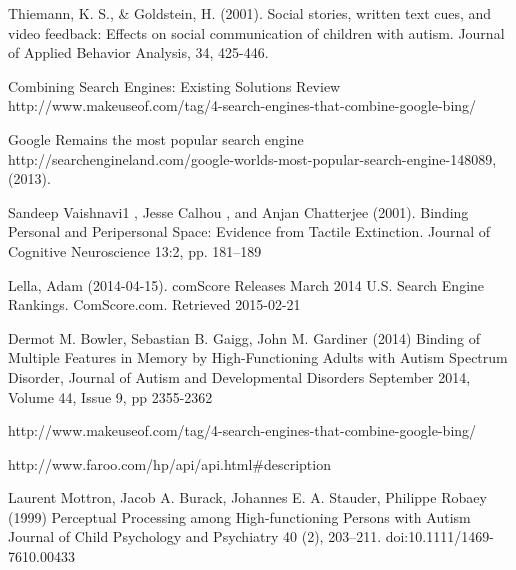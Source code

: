 \documentclass[10pt]{article}
\begin{document}
\begin{thebibliography}{100}
Thiemann, K. S., \& Goldstein, H. (2001). Social stories, written text cues, and video feedback: Effects on social communication of children with autism. Journal of Applied Behavior Analysis, 34, 425-446.


Combining Search Engines: Existing Solutions Review
http://www.makeuseof.com/tag/4-search-engines-that-combine-google-bing/


Google Remains the most popular search engine http://searchengineland.com/google-worlds-most-popular-search-engine-148089, (2013).  


Sandeep Vaishnavi1 , Jesse Calhou , and Anjan Chatterjee (2001). Binding Personal and Peripersonal Space: Evidence from Tactile Extinction. Journal of Cognitive Neuroscience 13:2, pp. 181–189


Lella, Adam (2014-04-15). comScore Releases March 2014 U.S. Search Engine Rankings. ComScore.com. Retrieved 2015-02-21

Dermot M. Bowler, Sebastian B. Gaigg, John M. Gardiner (2014) Binding of Multiple Features in Memory by High-Functioning Adults with Autism Spectrum Disorder, Journal of Autism and Developmental Disorders September 2014, Volume 44, Issue 9, pp 2355-2362


 http://www.makeuseof.com/tag/4-search-engines-that-combine-google-bing/


http://www.faroo.com/hp/api/api.html\#description

 Laurent Mottron, Jacob A. Burack, Johannes E. A. Stauder, Philippe Robaey (1999) Perceptual Processing among High-functioning Persons with Autism Journal of Child Psychology and Psychiatry 40 (2), 203–211. doi:10.1111/1469-7610.00433

\end{thebibliography}
\end{document}
